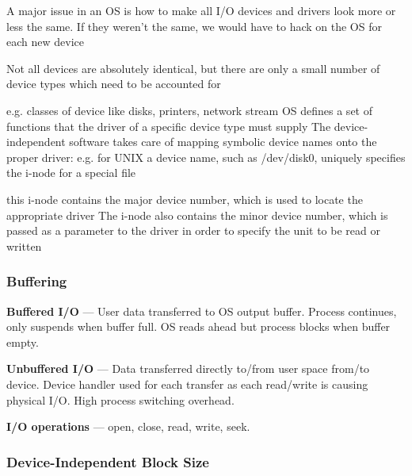 A major issue in an OS is how to make all I/O devices and drivers look
more or less the same. If they weren't the same, we would have to hack
on the OS for each new device

Not all devices are absolutely
identical, but there are only a small number of device types which need
to be accounted for

\begin{itemize}

    \vItem
          e.g. classes of device like disks, printers, network stream
    \vItem
          OS defines a set of functions that the driver of a specific device
          type must supply The device-independent software takes care of mapping
          symbolic device names onto the proper driver:
    \vItem
          e.g. for UNIX a device name, such as /dev/disk0, uniquely specifies
          the i-node for a special file

          \begin{itemize}

              \vItem
                    this i-node contains the major device number, which is used to
                    locate the appropriate driver
              \vItem
                    The i-node also contains the minor device number, which is passed as
                    a parameter to the driver in order to specify the unit to be read or
                    written
          \end{itemize}
\end{itemize}

\subsubsection*{Buffering}

\textbf{Buffered I/O} — User data transferred to OS output
buffer. Process continues, only suspends when buffer full.
OS reads ahead but process blocks when buffer empty.

\textbf{Unbuffered I/O} — Data transferred directly to/from user
space from/to device. Device handler used for each
transfer as each read/write is causing physical I/O. High
process switching overhead.

\textbf{I/O operations} — open, close, read, write, seek.


\subsubsection*{Device-Independent Block Size}

